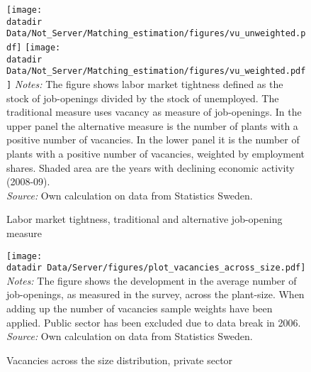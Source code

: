 \begin{figure}[h]
\centering
\caption{Labor market tightness, traditional and alternative job-opening measure}
\texttt{[image: \\datadir Data/Not\_Server/Matching\_estimation/figures/vu\_unweighted.pdf]}
\flushleft
\label{fig:tightness}
\vspace{0mm}
\centering
\texttt{[image: \\datadir Data/Not\_Server/Matching\_estimation/figures/vu\_weighted.pdf]}
\flushleft
\footnotesize{\emph{Notes:} The figure shows labor market tightness defined as the stock of job-openings divided by the stock of unemployed. The traditional measure uses vacancy as measure of job-openings. In the upper panel the alternative measure is the number of plants with a positive number of vacancies. In the lower panel it is the number of plants with a positive number of vacancies, weighted by employment shares.  Shaded area are the years with declining economic activity (2008-09).} \\
\footnotesize{\emph{Source:} Own calculation on data from Statistics Sweden.}
\label{fig:tightness}
\end{figure}



\begin{figure}[h]
\centering
\caption{Vacancies across the size distribution, private sector}
\texttt{[image: \\datadir Data/Server/figures/plot\_vacancies\_across\_size.pdf]}
\flushleft
\footnotesize{\emph{Notes:} The figure shows the development in the average number of job-openings, as measured in the survey, across the plant-size. When adding up the number of vacancies sample weights have been applied. Public sector has been excluded due to data break in 2006.} \\
\footnotesize{\emph{Source:} Own calculation on data from Statistics Sweden.}
\label{fig:vacancies_across_size}
\end{figure}


